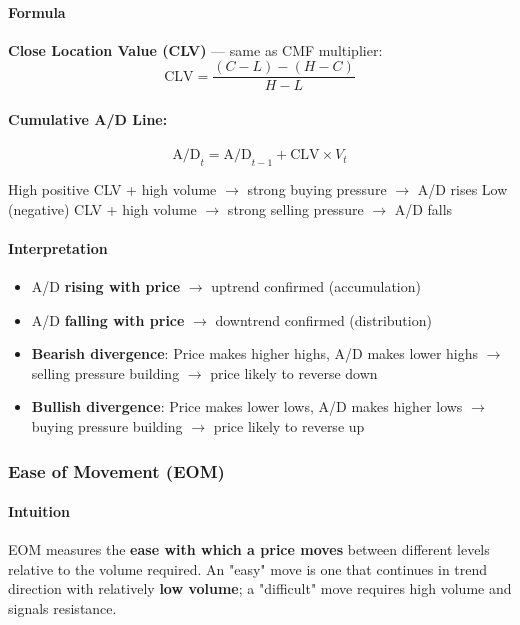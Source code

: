 \documentclass[12pt,openany]{book}
\begin{document}
\paragraph{Formula}

\textbf{Close Location Value (CLV)} --- same as CMF multiplier:
\[
\text{CLV} = \frac{(C - L) - (H - C)}{H - L}
\]

\paragraph{Cumulative A/D Line:}
\[
\text{A/D}_t = \text{A/D}_{t-1} + \text{CLV} \times V_t
\]

High positive CLV + high volume \(\rightarrow\) strong buying pressure \(\rightarrow\) A/D rises
Low (negative) CLV + high volume \(\rightarrow\) strong selling pressure \(\rightarrow\) A/D falls

\paragraph{Interpretation}
\begin{itemize}[leftmargin=*]
    \item A/D \textbf{rising with price} \(\rightarrow\) uptrend confirmed (accumulation)
    \item A/D \textbf{falling with price} \(\rightarrow\) downtrend confirmed (distribution)
    \item \textbf{Bearish divergence}: Price makes higher highs, A/D makes lower highs \(\rightarrow\) selling pressure building \(\rightarrow\) price likely to reverse down
    \item \textbf{Bullish divergence}: Price makes lower lows, A/D makes higher lows \(\rightarrow\) buying pressure building \(\rightarrow\) price likely to reverse up
\end{itemize}

\subsubsection{Ease of Movement (EOM)}

\paragraph{Intuition}
EOM measures the \textbf{ease with which a price moves} between different levels relative to the volume required. An "easy" move is one that continues in trend direction with relatively \textbf{low volume}; a "difficult" move requires high volume and signals resistance.
\end{document}

